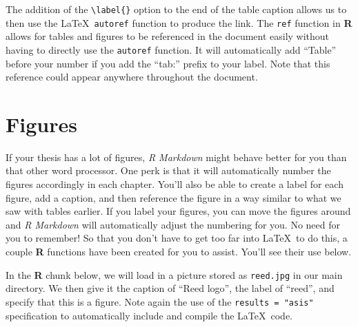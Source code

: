 \documentclass[12pt,twoside]{reedthesis}
\begin{document}
  The addition of the \texttt{\textbackslash{}label\{\}} option to the end
  of the table caption allows us to then use the \LaTeX~\texttt{autoref}
  function to produce the link. The \texttt{ref} function in \textbf{R}
  allows for tables and figures to be referenced in the document easily
  without having to directly use the \texttt{autoref} function. It will
  automatically add ``Table'' before your number if you add the ``tab:''
  prefix to your label. Note that this reference could appear anywhere
  throughout the document.
  
  \clearpage
  
  \section{Figures}\label{figures}
  
  If your thesis has a lot of figures, \emph{R Markdown} might behave
  better for you than that other word processor. One perk is that it will
  automatically number the figures accordingly in each chapter. You'll
  also be able to create a label for each figure, add a caption, and then
  reference the figure in a way similar to what we saw with tables
  earlier. If you label your figures, you can move the figures around and
  \emph{R Markdown} will automatically adjust the numbering for you. No
  need for you to remember! So that you don't have to get too far into
  \LaTeX~to do this, a couple \textbf{R} functions have been created for
  you to assist. You'll see their use below.
  
  In the \textbf{R} chunk below, we will load in a picture stored as
  \texttt{reed.jpg} in our main directory. We then give it the caption of
  ``Reed logo'', the label of ``reed'', and specify that this is a figure.
  Note again the use of the \texttt{results\ =\ "asis"} specification to
  automatically include and compile the \LaTeX~code.
  
  \begin{Shaded}
  \begin{Highlighting}[]
  \NormalTok{(} \NormalTok{, } \NormalTok{, }
         \NormalTok{, } \NormalTok{)}
  \end{Highlighting}
  \end{Shaded}
  
\end{document}
